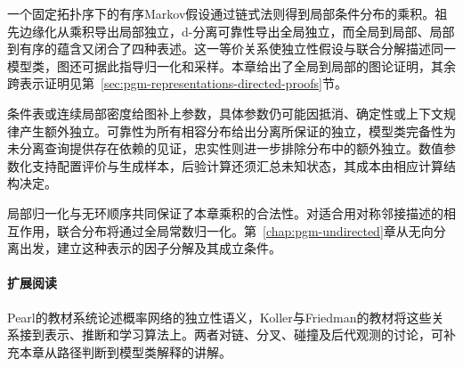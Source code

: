一个固定拓扑序下的有序Markov假设通过链式法则得到局部条件分布的乘积。祖先边缘化从乘积导出局部独立，d-分离可靠性导出全局独立，而全局到局部、局部到有序的蕴含又闭合了四种表述。这一等价关系使独立性假设与联合分解描述同一模型类，图还可据此指导归一化和采样。本章给出了全局到局部的图论证明，其余跨表示证明见第~\ref{sec:pgm-representations-directed-proofs}节。

条件表或连续局部密度给图补上参数，具体参数仍可能因抵消、确定性或上下文规律产生额外独立。可靠性为所有相容分布给出分离所保证的独立，模型类完备性为未分离查询提供存在依赖的见证，忠实性则进一步排除分布中的额外独立。数值参数化支持配置评价与生成样本，后验计算还须汇总未知状态，其成本由相应计算结构决定。

局部归一化与无环顺序共同保证了本章乘积的合法性。对适合用对称邻接描述的相互作用，联合分布将通过全局常数归一化。第~\ref{chap:pgm-undirected}章从无向分离出发，建立这种表示的因子分解及其成立条件。

\paragraph{扩展阅读}
Pearl的教材系统论述概率网络的独立性语义，Koller与Friedman的教材将这些关系接到表示、推断和学习算法上。两者对链、分叉、碰撞及后代观测的讨论，可补充本章从路径判断到模型类解释的讲解。

